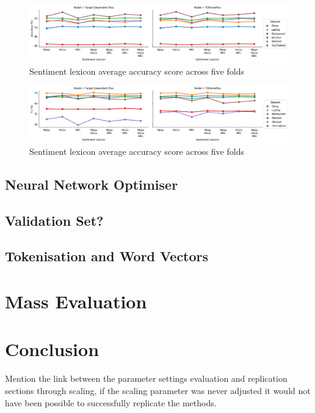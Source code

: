 \begin{figure}[!htb]
    \centering
    \includegraphics[scale=0.3]{images/reproducibility/Parameters/Sentiment_Lexicons/Sentiment_Lexicon_Accuracy_Plot.png}
    \caption{Sentiment lexicon average accuracy score across five folds}
    \label{fig:repro_param_senti_lex_avg_acc}
\end{figure}
\begin{figure}[!htb]
    \centering
    \includegraphics[scale=0.3]{images/reproducibility/Parameters/Sentiment_Lexicons/Sentiment_Lexicon_F1_Plot.png}
    \caption{Sentiment lexicon average accuracy score across five folds}
    \label{fig:repro_param_senti_lex_avg_f1}
\end{figure}
\newpage
\FloatBarrier
\subsection{Neural Network Optimiser}
\subsection{Validation Set?}
\subsection{Tokenisation and Word Vectors}
\section{Mass Evaluation}
\section{Conclusion}
Mention the link between the parameter settings evaluation and replication sections through scaling, if the scaling parameter was never adjusted it would not have been possible to successfully replicate the methods.
\label{section:repro_mass_eval}